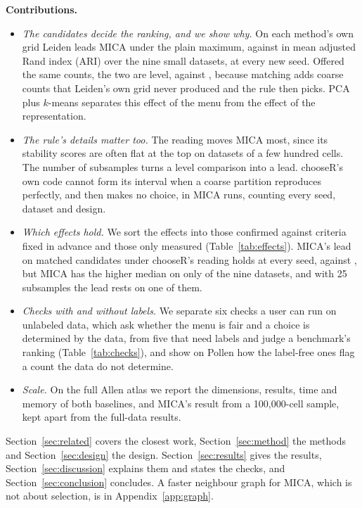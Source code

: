 \textbf{Contributions.}
\begin{itemize}
\item \emph{The candidates decide the ranking, and we show why.} On each method's own grid Leiden leads
MICA under the plain maximum,  against  in mean adjusted Rand
index (ARI) over the nine small datasets, at every new seed. Offered the same counts, the two are level,
 against , because matching adds coarse counts that Leiden's own grid
never produced and the rule then picks. PCA plus $k$-means separates this effect of the menu from the
effect of the representation.
\item \emph{The rule's details matter too.} The reading moves MICA most, since its stability scores are
often flat at the top on datasets of a few hundred cells. The number of subsamples turns a level
comparison into a lead. chooseR's own code cannot form its interval when a coarse partition reproduces
perfectly, and then makes no choice, in  MICA runs, counting every seed, dataset and design.
\item \emph{Which effects hold.} We sort the effects into those confirmed against criteria fixed in advance
and those only measured (Table~\ref{tab:effects}). MICA's lead on matched candidates under chooseR's reading holds at
every seed,  against , but MICA has the higher median on only
 of the nine datasets, and with 25 subsamples the lead rests on one of them.
\item \emph{Checks with and without labels.} We separate six checks a user can run on unlabeled data, which
ask whether the menu is fair and a choice is determined by the data, from five that need labels and judge a benchmark's ranking
(Table~\ref{tab:checks}), and show on Pollen how the label-free ones flag a count the data do not
determine.
\item \emph{Scale.} On the full Allen atlas we report the dimensions, results, time and memory of both
baselines, and MICA's result from a 100,000-cell sample, kept apart from the full-data results.
\end{itemize}

Section~\ref{sec:related} covers the closest work, Section~\ref{sec:method} the methods and
Section~\ref{sec:design} the design. Section~\ref{sec:results} gives the results,
Section~\ref{sec:discussion} explains them and states the checks, and Section~\ref{sec:conclusion}
concludes. A faster neighbour graph for MICA, which is not about selection, is in
Appendix~\ref{app:graph}.
